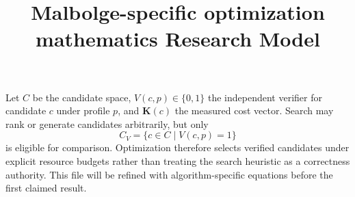 \documentclass{article}
\title{Malbolge-specific optimization mathematics Research Model}
\begin{document}
\maketitle
Let $C$ be the candidate space, $V(c,p)\in\{0,1\}$ the independent verifier
for candidate $c$ under profile $p$, and $\mathbf{K}(c)$ the measured cost
vector. Search may rank or generate candidates arbitrarily, but only
\[
  C_V = \{c\in C\mid V(c,p)=1\}
\]
is eligible for comparison. Optimization therefore selects verified candidates
under explicit resource budgets rather than treating the search heuristic as a
correctness authority. This file will be refined with algorithm-specific
equations before the first claimed result.
\end{document}

